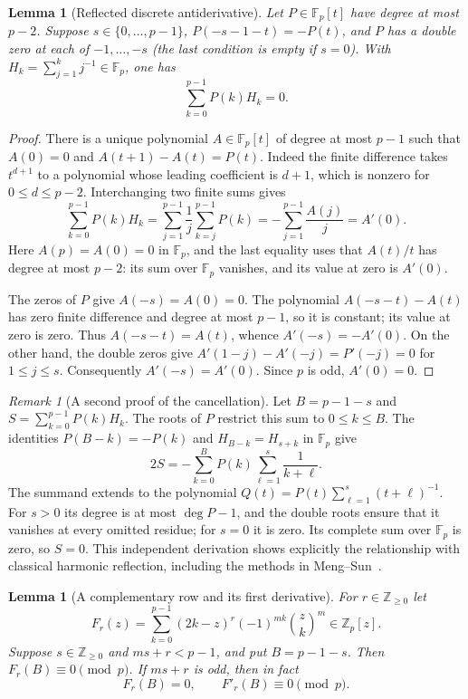 \documentclass[11pt,a4paper]{article}
\newtheorem{lemma}[theorem]{Lemma}
\theoremstyle{remark}
\newtheorem{remark}[theorem]{Remark}
\newcommand{\Fp}{\mathbb F_p}
\begin{document}
\begin{lemma}[Reflected discrete antiderivative]\label{lem:antiderivative}
Let $P\in\mathbb F_p[t]$ have degree at most $p-2$.
Suppose $s\in\{0,\ldots,p-1\}$, $P(-s-1-t)=-P(t)$, and $P$ has a double zero
at each of $-1,\ldots,-s$ (the last condition is empty if $s=0$).
With $H_k=\sum_{j=1}^k j^{-1}\in\mathbb F_p$, one has
\[
                    \sum_{k=0}^{p-1}P(k)H_k=0.
\]
\end{lemma}

\begin{proof}
There is a unique polynomial $A\in\mathbb F_p[t]$ of degree at most
$p-1$ such that $A(0)=0$ and $A(t+1)-A(t)=P(t)$.
Indeed the finite difference takes $t^{d+1}$ to a polynomial whose
leading coefficient is $d+1$, which is nonzero for $0\le d\le p-2$.
Interchanging two finite sums gives
\[
 \sum_{k=0}^{p-1}P(k)H_k
 =\sum_{j=1}^{p-1}\frac1j\sum_{k=j}^{p-1}P(k)
 =-\sum_{j=1}^{p-1}\frac{A(j)}j=A'(0).
\]
Here $A(p)=A(0)=0$ in $\mathbb F_p$, and the last equality uses
that $A(t)/t$ has degree at most $p-2$: its sum over $\mathbb F_p$
vanishes, and its value at zero is $A'(0)$.

The zeros of $P$ give $A(-s)=A(0)=0$. The polynomial
$A(-s-t)-A(t)$ has zero finite difference and degree at most $p-1$,
so it is constant; its value at zero is zero. Thus
$A(-s-t)=A(t)$, whence $A'(-s)=-A'(0)$.
On the other hand, the double zeros give
$A'(1-j)-A'(-j)=P'(-j)=0$ for $1\le j\le s$.
Consequently $A'(-s)=A'(0)$. Since $p$ is odd, $A'(0)=0$.
\end{proof}

\begin{remark}[A second proof of the cancellation]
Let $B=p-1-s$ and $S=\sum_{k=0}^{p-1}P(k)H_k$.
The roots of $P$ restrict this sum to $0\le k\le B$.
The identities $P(B-k)=-P(k)$ and $H_{B-k}=H_{s+k}$ in $\Fp$
give
\[
 2S=-\sum_{k=0}^{B}P(k)\sum_{\ell=1}^{s}\frac1{k+\ell}.
\]
The summand extends to the polynomial
$Q(t)=P(t)\sum_{\ell=1}^s(t+\ell)^{-1}$.
For $s>0$ its degree is at most $\deg P-1$, and the double roots
ensure that it vanishes at every omitted residue; for $s=0$ it is zero.
Its complete sum over $\Fp$ is zero, so $S=0$.
This independent derivation shows explicitly the relationship with
classical harmonic reflection, including the methods in
Meng--Sun~\cite{mengsun2015}.
\end{remark}

\begin{lemma}[A complementary row and its first derivative]\label{lem:row-jet}
For $r\in\mathbb Z_{\ge0}$ let
\[
 F_r(z)=\sum_{k=0}^{p-1}(2k-z)^r(-1)^{mk}\binom zk^m
                 \in\mathbb Z_p[z].
\]
Suppose $s\in\mathbb Z_{\ge0}$ and $ms+r<p-1$, and put $B=p-1-s$.
Then $F_r(B)\equiv0\pmod p$.
If $ms+r$ is odd, then in fact
\[
                F_r(B)=0,\qquad F'_r(B)\equiv0\pmod p.
\]
\end{lemma}
\end{document}
